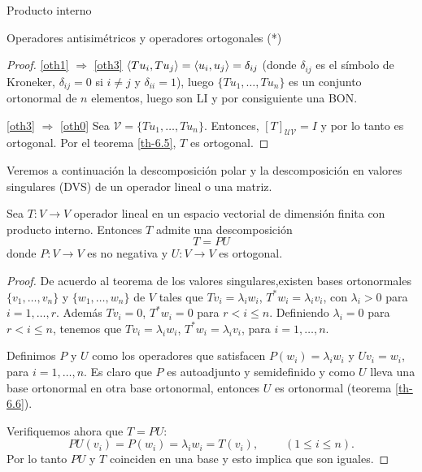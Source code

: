 \begin{chapter}{Producto interno}
\begin{section}{Operadores antisim\'etricos y operadores ortogonales (*)}
\begin{proof}
            
            
            \ref{oth1} $\Rightarrow$ \ref{oth3} $\langle Tu_i,Tu_j\rangle = \langle u_i,u_j\rangle = \delta_{ij}$ (donde $\delta_{ij}$ es el símbolo de Kroneker, $\delta_{ij}=0$ si $i\ne j$ y $\delta_{ii}=1$), luego $\{Tu_1,\ldots,Tu_n\}$ es un conjunto ortonormal  de $n$ elementos, luego son LI y por consiguiente una BON. 
            
            \ref{oth3} $\Rightarrow$ \ref{oth0} Sea $\mathcal V =\{Tu_1,\ldots,Tu_n\}$. Entonces,  $[T]_{\mathcal U \mathcal V}=I$ y por lo tanto es ortogonal. Por el teorema \ref{th-6.5}, $T$  es ortogonal. 
        \end{proof}
        
        Veremos a continuación la descomposición polar y la descomposición en valores singulares (DVS) de un operador lineal o una matriz. 
        
        \begin{teorema} Sea $T: V \to V$ operador lineal en un espacio vectorial de dimensión finita con producto interno. Entonces $T$  admite una descomposición
            $$
            T = PU
            $$
            donde $P:V \to V$ es no negativa y $U: V \to V$  es ortogonal.
        \end{teorema}
        \begin{proof}
        De acuerdo al teorema de los valores singulares,existen bases ortonormales $\{v_1,\ldots,v_n\}$ y $\{w_1,\ldots,w_n\}$  de $V$ tales que $Tv_i = \lambda_i w_i$,  $T^*w_i = \lambda_i v_i$, con $\lambda_i >0$ para $i=1,\ldots,r$. Además $Tv_i = 0$,  $T^*w_i = 0$ para $r < i \le n$. Definiendo $\lambda_i =0$ para $r < i \le n$,  tenemos que $Tv_i = \lambda_i w_i$,  $T^*w_i = \lambda_i v_i$, para $i=1,\ldots,n$.
        
        Definimos $P$ y $U$ como los operadores que satisfacen $P(w_i) = \lambda_i w_i$ y $Uv_i = w_i$, para $i=1,\ldots,n$. Es claro que $P$ es autoadjunto y semidefinido y como $U$ lleva una base ortonormal en otra base ortonormal,  entonces $U$  es ortonormal (teorema \ref{th-6.6}).
        
        Verifiquemos ahora que $T =PU$: 
        $$
        PU(v_i) = P(w_i) = \lambda_i w_i = T(v_i), \;\qquad(1 \le i \le n).
        $$ 
        Por lo tanto  $PU$ y $T$ coinciden en una base y esto implica que son iguales.
         

\end{proof}
\end{section}
\end{chapter}
